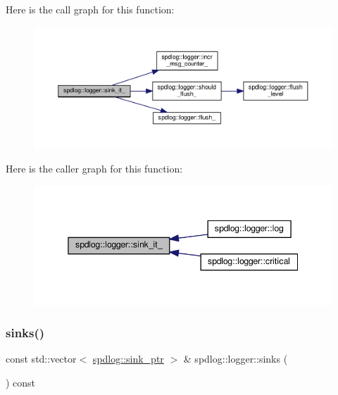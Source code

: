 Here is the call graph for this function\+:
\nopagebreak
\begin{figure}[H]
\begin{center}
\leavevmode
\includegraphics[width=350pt]{classspdlog_1_1logger_a43ac8d73671a109cba253eadb0b049e2_cgraph}
\end{center}
\end{figure}
Here is the caller graph for this function\+:
\nopagebreak
\begin{figure}[H]
\begin{center}
\leavevmode
\includegraphics[width=345pt]{classspdlog_1_1logger_a43ac8d73671a109cba253eadb0b049e2_icgraph}
\end{center}
\end{figure}
\mbox{\label{classspdlog_1_1logger_a00c27f251b795caf028718b605572e1f}} 
\subsubsection{\texorpdfstring{sinks()}{sinks()}\hspace{0.1cm}{\footnotesize\ttfamily [1/2]}}
{\footnotesize\ttfamily const std\+::vector$<$ \hyperlink{namespacespdlog_a422c57d3088160b517e5a74e5f318253}{spdlog\+::sink\+\_\+ptr} $>$ \& spdlog\+::logger\+::sinks (\begin{DoxyParamCaption}{ }\end{DoxyParamCaption}) const\hspace{0.3cm}{\ttfamily [inline]}}



